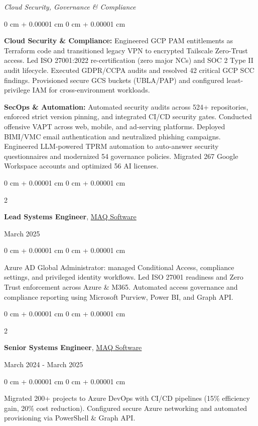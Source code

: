 \documentclass[10pt, letterpaper]{article}
\newenvironment{onecolentry}{
    \begin{adjustwidth}{
        0 cm + 0.00001 cm
    }{
        0 cm + 0.00001 cm
    }
}{
    \end{adjustwidth}
}
\newenvironment{twocolentry}[2][]{
    \onecolentry
    \def\secondColumn{#2}
    \setcolumnwidth{\fill, 4.5 cm}
    \begin{paracol}{2}
}{
    \switchcolumn \raggedleft \secondColumn
    \end{paracol}
    \endonecolentry
}
\begin{document}
\vspace{0.10 cm}
\textit{Cloud Security, Governance \& Compliance}
\begin{onecolentry}
    \textbf{Cloud Security \& Compliance:} Engineered GCP PAM entitlements as Terraform code and transitioned legacy VPN to encrypted Tailscale Zero-Trust access. Led ISO 27001:2022 re-certification (zero major NCs) and SOC 2 Type II audit lifecycle. Executed GDPR/CCPA audits and resolved 42 critical GCP SCC findings. Provisioned secure GCS buckets (UBLA/PAP) and configured least-privilege IAM for cross-environment workloads.

    \textbf{SecOps \& Automation:} Automated security audits across 524+ repositories, enforced strict version pinning, and integrated CI/CD security gates. Conducted offensive VAPT across web, mobile, and ad-serving platforms. Deployed BIMI/VMC email authentication and neutralized phishing campaigns. Engineered LLM-powered TPRM automation to auto-answer security questionnaires and modernized 54 governance policies. Migrated 267 Google Workspace accounts and optimized 56 AI licenses.
\end{onecolentry}

\vspace{0.2 cm}

\begin{twocolentry}{March 2025}
    \textbf{Lead Systems Engineer}, \href{https://maqsoftware.com/}{MAQ Software}
\end{twocolentry}

\vspace{0.10 cm}
\begin{onecolentry}
    Azure AD Global Administrator: managed Conditional Access, compliance settings, and privileged identity workflows. Led ISO 27001 readiness and Zero Trust enforcement across Azure \& M365. Automated access governance and compliance reporting using Microsoft Purview, Power BI, and Graph API.
\end{onecolentry}

\vspace{0.2 cm}

\begin{twocolentry}{March 2024 - March 2025}
    \textbf{Senior Systems Engineer}, \href{https://maqsoftware.com/}{MAQ Software}
\end{twocolentry}

\vspace{0.10 cm}
\begin{onecolentry}
    Migrated 200+ projects to Azure DevOps with CI/CD pipelines (15\% efficiency gain, 20\% cost reduction). Configured secure Azure networking and automated provisioning via PowerShell \& Graph API.
\end{onecolentry}
\end{document}
